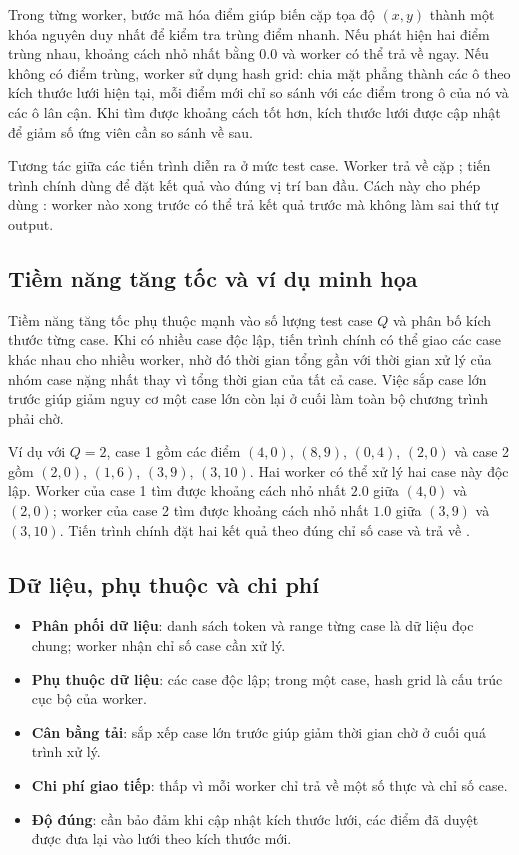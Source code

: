 Trong từng worker, bước mã hóa điểm giúp biến cặp tọa độ $(x,y)$ thành một khóa nguyên duy nhất để kiểm tra trùng điểm nhanh. Nếu phát hiện hai điểm trùng nhau, khoảng cách nhỏ nhất bằng $0.0$ và worker có thể trả về ngay. Nếu không có điểm trùng, worker sử dụng hash grid: chia mặt phẳng thành các ô theo kích thước lưới hiện tại, mỗi điểm mới chỉ so sánh với các điểm trong ô của nó và các ô lân cận. Khi tìm được khoảng cách tốt hơn, kích thước lưới được cập nhật để giảm số ứng viên cần so sánh về sau.

Tương tác giữa các tiến trình diễn ra ở mức test case. Worker trả về cặp ; tiến trình chính dùng  để đặt kết quả vào đúng vị trí ban đầu. Cách này cho phép dùng : worker nào xong trước có thể trả kết quả trước mà không làm sai thứ tự output.

\subsection{Tiềm năng tăng tốc và ví dụ minh họa}
Tiềm năng tăng tốc phụ thuộc mạnh vào số lượng test case $Q$ và phân bố kích thước từng case. Khi có nhiều case độc lập, tiến trình chính có thể giao các case khác nhau cho nhiều worker, nhờ đó thời gian tổng gần với thời gian xử lý của nhóm case nặng nhất thay vì tổng thời gian của tất cả case. Việc sắp case lớn trước giúp giảm nguy cơ một case lớn còn lại ở cuối làm toàn bộ chương trình phải chờ.

Ví dụ với $Q=2$, case 1 gồm các điểm $(4,0)$, $(8,9)$, $(0,4)$, $(2,0)$ và case 2 gồm $(2,0)$, $(1,6)$, $(3,9)$, $(3,10)$. Hai worker có thể xử lý hai case này độc lập. Worker của case 1 tìm được khoảng cách nhỏ nhất $2.0$ giữa $(4,0)$ và $(2,0)$; worker của case 2 tìm được khoảng cách nhỏ nhất $1.0$ giữa $(3,9)$ và $(3,10)$. Tiến trình chính đặt hai kết quả theo đúng chỉ số case và trả về \func{[2.0, 1.0]}.

\subsection{Dữ liệu, phụ thuộc và chi phí}
\begin{itemize}
  \item \textbf{Phân phối dữ liệu}: danh sách token và range từng case là dữ liệu đọc chung; worker nhận chỉ số case cần xử lý.
  \item \textbf{Phụ thuộc dữ liệu}: các case độc lập; trong một case, hash grid là cấu trúc cục bộ của worker.
  \item \textbf{Cân bằng tải}: sắp xếp case lớn trước giúp giảm thời gian chờ ở cuối quá trình xử lý.
  \item \textbf{Chi phí giao tiếp}: thấp vì mỗi worker chỉ trả về một số thực và chỉ số case.
  \item \textbf{Độ đúng}: cần bảo đảm khi cập nhật kích thước lưới, các điểm đã duyệt được đưa lại vào lưới theo kích thước mới.
\end{itemize}

